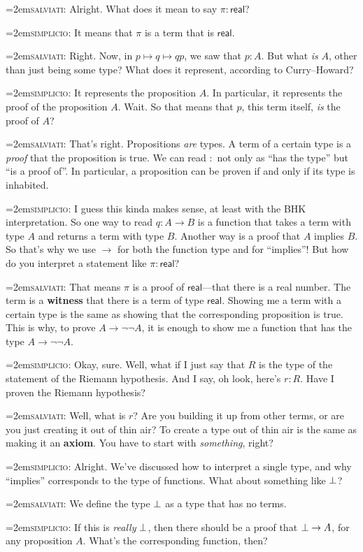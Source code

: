 \documentclass[11pt,paper=letter]{scrartcl}
\newcommand{\sf}{\mathsf}
\renewcommand{\lnot}{\neg}
\newcommand{\simp}{\vspace{0.5em}\noindent\hangindent=2em\textsc{simplicio:} }
\newcommand{\salv}{\vspace{0.5em}\noindent\hangindent=2em\textsc{salviati:} }
\begin{document}
\salv Alright. What does it mean to say $\pi : \sf{real}$?

\simp It means that $\pi$ is a term that is $\sf{real}$.

\salv Right. Now, in $p \mapsto q \mapsto qp$, we saw that $p : A$. But what \emph{is} $A$, other than just being some type? What does it represent, according to Curry--Howard?

\simp It represents the proposition $A$. In particular, it represents the proof of the proposition $A$. Wait. So that means that $p$, this term itself, \emph{is} the proof of $A$?

\salv That's right. Propositions \emph{are} types. A term of a certain type is a \emph{proof} that the proposition is true. We can read $:$ not only as ``has the type'' but ``is a proof of''. In particular, a proposition can be proven if and only if its type is inhabited.

\simp I guess this kinda makes sense, at least with the BHK interpretation. So one way to read $q : A \to B$ is a function that takes a term with type $A$ and returns a term with type $B$. Another way is a proof that $A$ implies $B$. So that's why we use $\to$ for both the function type and for ``implies''! But how do you interpret a statement like $\pi : \sf{real}$?

\salv That means $\pi$ is a proof of $\sf{real}$---that there is a real number. The term is a \textbf{witness} that there is a term of type $\sf{real}$. Showing me a term with a certain type is the same as showing that the corresponding proposition is true. This is why, to prove $A \to \lnot\lnot A$, it is enough to show me a function that has the type $A \to \lnot\lnot A$.

\simp Okay, sure. Well, what if I just say that $R$ is the type of the statement of the Riemann hypothesis. And I say, oh look, here's $r : R$. Have I proven the Riemann hypothesis?

\salv Well, what is $r$? Are you building it up from other terms, or are you just creating it out of thin air? To create a type out of thin air is the same as making it an \textbf{axiom}. You have to start with \emph{something}, right?

\simp Alright. We've discussed how to interpret a single type, and why ``implies'' corresponds to the type of functions. What about something like $\bot$?

\salv We define the type $\bot$ as a type that has no terms.

\simp If this is \emph{really} $\bot$, then there should be a proof that $\bot \to A$, for any proposition $A$. What's the corresponding function, then?
\end{document}
